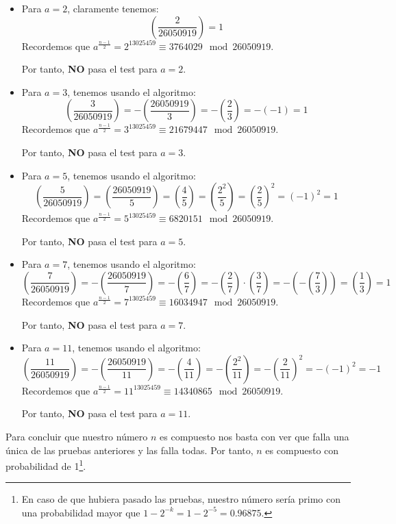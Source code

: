 \begin{enumerate}
		\begin{itemize}
			\item Para $a = 2$, claramente tenemos:
			$$\left(\frac{2}{26050919} \right) = 1$$
			Recordemos que $ a^{\frac{n-1}{2}} = 2^{13025459} \equiv 3764029 \mod{26050919}$.
			
			Por tanto, \textbf{NO} pasa el test para $a = 2$.
			
			\item Para $a = 3$, tenemos usando el algoritmo:
			$$\left(\frac{3}{26050919} \right) = -\left(\frac{26050919}{3} \right) = -\left(\frac{2}{3}\right) =
			-(-1) = 1$$
			Recordemos que $ a^{\frac{n-1}{2}} = 3^{13025459} \equiv 21679447 \mod{26050919}$.
			
			Por tanto, \textbf{NO} pasa el test para $a = 3$.
			
			\item Para $a = 5$, tenemos usando el algoritmo:
			$$\left(\frac{5}{26050919} \right) = \left(\frac{26050919}{5} \right) =  \left(\frac{4}{5} \right) =
			\left(\frac{2^2}{5} \right) = \left(\frac{2}{5} \right)^2 = (-1)^2 = 1$$
			Recordemos que $ a^{\frac{n-1}{2}} = 5^{13025459} \equiv 6820151 \mod{26050919}$.
			
			Por tanto, \textbf{NO} pasa el test para $a = 5$.
			
			\item Para $a = 7$, tenemos usando el algoritmo:
			$$\left(\frac{7}{26050919} \right) = -\left(\frac{26050919}{7} \right) = -\left(\frac{6}{7} \right) =
			-\left(\frac{2}{7} \right) \cdot \left(\frac{3}{7} \right) = -\left(-\left(\frac{7}{3} \right) \right)
			= \left(\frac{1}{3} \right) = 1$$
			Recordemos que $ a^{\frac{n-1}{2}} = 7^{13025459} \equiv 16034947 \mod{26050919}$.
			
			Por tanto, \textbf{NO} pasa el test para $a = 7$.
			
			\item Para $a = 11$, tenemos usando el algoritmo:
			$$\left(\frac{11}{26050919} \right) = -\left(\frac{26050919}{11} \right) = -\left(\frac{4}{11} \right)
			= -\left(\frac{2^2}{11} \right) = -\left(\frac{2}{11} \right)^2 = -(-1)^2 = -1$$
			Recordemos que $ a^{\frac{n-1}{2}} = 11^{13025459} \equiv 14340865 \mod{26050919}$.
			
			Por tanto, \textbf{NO} pasa el test para $a = 11$.		
		\end{itemize}
		
		Para concluir que nuestro número $n$ es compuesto nos basta con ver que falla una única de las pruebas
		anteriores y las falla todas. Por tanto, $n$ es compuesto con probabilidad de 1\footnote{En caso de que
		hubiera pasado las pruebas, nuestro número sería primo con una probabilidad mayor que $1-2^{-k} =
		1-2^{-5} = 0.96875$.}.
		
	\end{enumerate}
